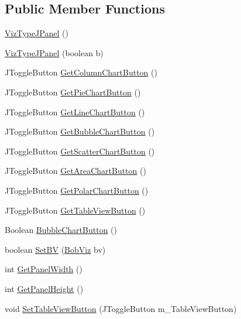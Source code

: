 \subsection*{Public Member Functions}
\begin{DoxyCompactItemize}
\item 
\hyperlink{class_viz_type_j_panel_ade1f7a00feed7a67bffabbaf9762f20f}{Viz\-Type\-J\-Panel} ()
\item 
\hyperlink{class_viz_type_j_panel_ab94442b4a1e1906ca3121fefcead19fa}{Viz\-Type\-J\-Panel} (boolean b)
\item 
J\-Toggle\-Button \hyperlink{class_viz_type_j_panel_a1d7f828f25ee2f352df65055e206178a}{Get\-Column\-Chart\-Button} ()
\item 
J\-Toggle\-Button \hyperlink{class_viz_type_j_panel_ae0e3195c99ed0025b23fb1dc72268b86}{Get\-Pie\-Chart\-Button} ()
\item 
J\-Toggle\-Button \hyperlink{class_viz_type_j_panel_a0550cb9b18806122a76a5dc600ad861a}{Get\-Line\-Chart\-Button} ()
\item 
J\-Toggle\-Button \hyperlink{class_viz_type_j_panel_a1d11994e9ddc79724ff8891280a71b32}{Get\-Bubble\-Chart\-Button} ()
\item 
J\-Toggle\-Button \hyperlink{class_viz_type_j_panel_aa16fca19c0ef36ff6cdf5b408ba2fbf1}{Get\-Scatter\-Chart\-Button} ()
\item 
J\-Toggle\-Button \hyperlink{class_viz_type_j_panel_aff060b4c6d74adbe43c674e007ff632a}{Get\-Area\-Chart\-Button} ()
\item 
J\-Toggle\-Button \hyperlink{class_viz_type_j_panel_a901113d4dd60480e8322182dc81de871}{Get\-Polar\-Chart\-Button} ()
\item 
J\-Toggle\-Button \hyperlink{class_viz_type_j_panel_a48853498dd3ae16b395b1a84044531d2}{Get\-Table\-View\-Button} ()
\item 
Boolean \hyperlink{class_viz_type_j_panel_a2dffefeb21c55d793593b1dacb364cf9}{Bubble\-Chart\-Button} ()
\item 
boolean \hyperlink{class_viz_type_j_panel_a83704bbce2513028139d3acea7a85907}{Set\-B\-V} (\hyperlink{class_bob_viz}{Bob\-Viz} bv)
\item 
int \hyperlink{class_viz_type_j_panel_adfd6c664764e55323f59ec7991be02d6}{Get\-Panel\-Width} ()
\item 
int \hyperlink{class_viz_type_j_panel_afabba3b86d50daf0627d3f5a1ced0681}{Get\-Panel\-Height} ()
\item 
void \hyperlink{class_viz_type_j_panel_a1e5bbe625fdca3098a662b73fa252fae}{Set\-Table\-View\-Button} (J\-Toggle\-Button m\-\_\-\-Table\-View\-Button)
\end{DoxyCompactItemize}

